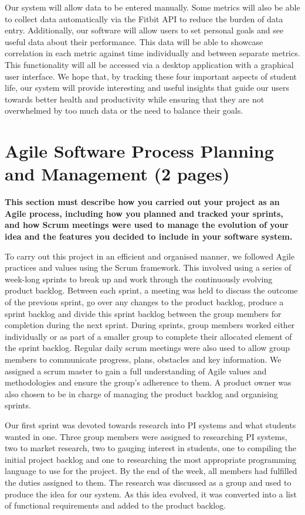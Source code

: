 \documentclass[12pt]{article}
\begin{document}
Our system will allow data to be entered manually. Some metrics will also be able to collect data automatically via the Fitbit API to reduce the burden of data entry. Additionally, our software will allow users to set personal goals and see useful data about their performance. This data will be able to showcase correlation in each metric against time individually and between separate metrics. This functionality will all be accessed via a desktop application with a graphical user interface. We hope that, by tracking these four important aspects of student life, our system will provide interesting and useful insights that guide our users towards better health and productivity while ensuring that they are not overwhelmed by too much data or the need to balance their goals.


\section{Agile Software Process Planning and Management (2 pages)}
\textbf{This section must describe how you carried out your project as an Agile process, including
how you planned and tracked your sprints, and how Scrum meetings were used to manage
the evolution of your idea and the features you decided to include in your software system.}\par
To carry out this project in an efficient and organised manner, we followed Agile practices and values using the Scrum framework. This involved using a series of week-long sprints to break up and work through the continuously evolving product backlog. Between each sprint, a meeting was held to discuss the outcome of the previous sprint, go over any changes to the product backlog, produce a sprint backlog and divide this sprint backlog between the group members for completion during the next sprint. During sprints, group members worked either individually or as part of a smaller group to complete their allocated element of the sprint backlog. Regular daily scrum meetings were also used to allow group members to communicate progress, plans, obstacles and key information. We assigned a scrum master to gain a full understanding of Agile values and methodologies and ensure the group's adherence to them. A product owner was also chosen to be in charge of managing the product backlog and organising sprints.\par

Our first sprint was devoted towards research into PI systems and what students wanted in one. Three group members were assigned to researching PI systems, two to market research, two to gauging interest in students, one to compiling the initial project backlog and one to researching the most appropriate programming language to use for the project. By the end of the week, all members had fulfilled the duties assigned to them. The research was discussed as a group and used to produce the idea for our system. As this idea evolved, it was converted into a list of functional requirements and added to the product backlog.\par
\end{document}
